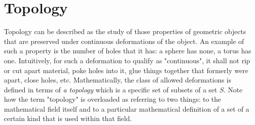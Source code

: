 \chapter{Topology}
Topology can be described as the study of those properties of geometric objects that are preserved under continuous deformations of the object. An example of such a property is the number of holes that it has: a sphere has none, a torus has one. Intuitively, for such a deformation to qualify as "continuous", it shall not rip or cut apart material, poke holes into it, glue things together that formerly were apart, close holes, etc. Mathematically, the class of allowed deformations is defined in terms of \emph{a topology} which is a specific set of subsets of a set $S$. Note how the term "topology" is overloaded as referring to two things: to the mathematical field itself and to a particular mathematical definition of a set of a certain kind that is used within that field.



\begin{comment}


https://en.wikipedia.org/wiki/Topology

https://en.wikipedia.org/wiki/Topological_space

\end{comment}